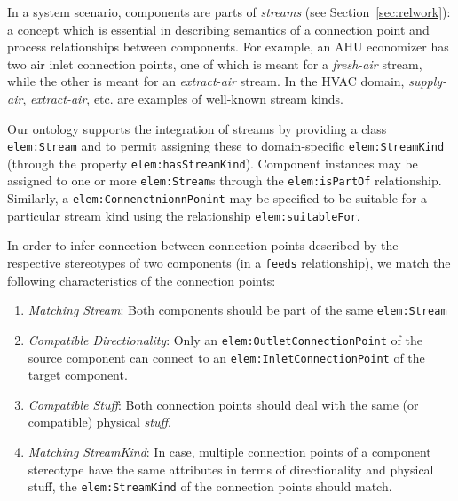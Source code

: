 \documentclass[sigconf]{acmart}
\begin{document}

In a system scenario, components are parts of \textit{streams} (see Section~\ref{sec:relwork}): a concept which is essential in describing semantics of a connection point and process relationships between components.
For example, an AHU economizer has two air inlet connection points, one of which is meant for a \textit{fresh-air} stream, while the other is meant for an \textit{extract-air} stream.
In the HVAC domain, \emph{supply-air}, \emph{extract-air}, etc. are examples of well-known stream kinds.

Our ontology supports the integration of streams by providing a class \texttt{elem:Stream} and to permit assigning these to domain-specific \texttt{elem:StreamKind} (through the property \texttt{elem:has\-Stream\-Kind}).
Component instances may be assigned to one or more \texttt{elem:Stream}s through the \texttt{elem:isPartOf} relationship.
Similarly, a \texttt{elem:Con\-nen\-ctn\-ionn\-Pon\-int} may be specified to be suitable for a particular stream kind using the relationship \texttt{elem:suit\-able\-For}.

In order to infer connection between connection points described by the respective stereotypes of two components (in a \texttt{feeds} relationship), we match the following characteristics of the connection points:

\begin{enumerate}
    \item \emph{Matching Stream}: Both components should be part of the same \texttt{elem:Stream}
    \item \emph{Compatible Directionality}: Only an \texttt{elem:Outlet\-Con\-ne\-ct\-ion\-Poi\-nt} of the source component can connect to an \texttt{elem:In\-let\-Con\-ne\-ct\-ion\-Po\-int} of the target component.
    \item \emph{Compatible Stuff}: Both connection points should deal with the same (or compatible) physical \textit{stuff}.
    \item \emph{Matching StreamKind}: In case, multiple connection points of a component stereotype have the same attributes in terms of directionality and physical stuff, the \texttt{elem:StreamKind} of the connection points should match.
\end{enumerate}
\end{document}

